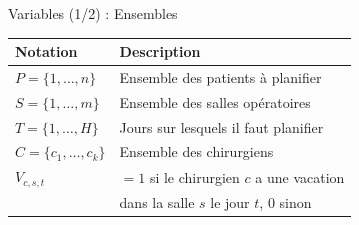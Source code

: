 
\begin{frame}{Variables (1/2) : Ensembles}
  \begin{table}
    \centering
    \begin{tabular}{ll}
      \toprule
      \textbf{Notation} & \textbf{Description} \\
      \midrule
      $P = \{1, \ldots, n\}$ & Ensemble des patients à planifier \\
      $S = \{1, \ldots, m\}$ & Ensemble des salles opératoires \\
      $T = \{1, \ldots, H\}$ & Jours sur lesquels il faut planifier \\
      $C = \{c_1, \ldots, c_k\}$ & Ensemble des chirurgiens \\
      $V_{c,s,t}$ & $= 1$ si le chirurgien $c$ a une vacation \\
                  & dans la salle $s$ le jour $t$, $0$ sinon \\
      \bottomrule
    \end{tabular}
  \end{table}
\end{frame}

